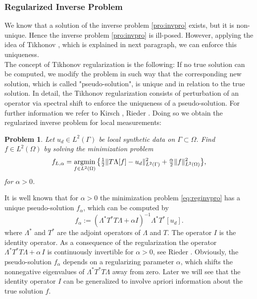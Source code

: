 \documentclass[a4paper, 11pt, twoside]{article}
\newtheorem*{problem}{Problem}
\newcommand{\argmin}{\operatornamewithlimits{argmin}}
\begin{document}
\subsubsection{Regularized Inverse Problem}\label{sec:reginvpro}
%
We know that a solution of the inverse problem \eqref{pro:invpro} exists, but it is non-unique. Hence the inverse problem \eqref{pro:invpro} is ill-posed. However, applying the idea of Tikhonov \cite{bib:tik63}, which is explained in next paragraph, we can enforce this uniqueness.\\

The concept of Tikhonov regularization is the following: If no true solution can be computed, we modify the problem in such way that the corresponding new solution, which is called "pseudo-solution", is unique and in relation to the true solution. In detail, the Tikhonov regularization consists of perturbation of an operator via spectral shift to enforce the uniqueness of a pseudo-solution. For further information we refer to Kirsch \cite{bib:kir96}, Rieder \cite{bib:rie03}. Doing so we obtain the regularized inverse problem for local measurements:
\begin{problem}
Let $u_d\in L^2(\Gamma)$ be local synthetic data on $\Gamma\subset\Omega$. Find $f\in L^2(\Omega)$ by solving the minimization problem
%
\begin{equation}\label{eq:reginvpro}
  f_{L,\alpha}=
  \argmin_{f\in L^2(\Omega)}\big\{\tfrac{1}{2}\|T\Lambda[f]-u_d\|^2_{L^2(\Gamma)}
  +\tfrac{\alpha}{2}\|f\|^2_{L^2(\Omega)}\big\},
\end{equation}
%
%
for $\alpha>0$.
\end{problem}
It is well known that for $\alpha>0$ the minimization problem \eqref{eq:reginvpro} has a unique pseudo-solution $f_{\alpha}$, which can be computed by
%
\begin{equation}\label{eq:pseudosolution}
  f_{\alpha}:=(\Lambda^*T^*T\Lambda+\alpha I)^{-1}\Lambda^*T^*[u_d].
\end{equation}
%
where $\Lambda^*$ and $T^*$ are the adjoint operators of $\Lambda$ and $T$. The operator $I$ is the identity operator. As a consequence of the regularization the operator $\Lambda^*T^*T\Lambda+\alpha\,I$ is continuously invertible for $\alpha>0$, see Rieder \cite[Chap.]{bib:rie03}. Obviously, the pseudo-solution $f_{\alpha}$ depends on a regularizing parameter $\alpha$, which shifts the nonnegative eigenvalues of $\Lambda^*T^*T\Lambda$ away from zero. Later we will see that the identity operator $I$ can be generalized to involve apriori information about the true solution $f$.\\
\end{document}
